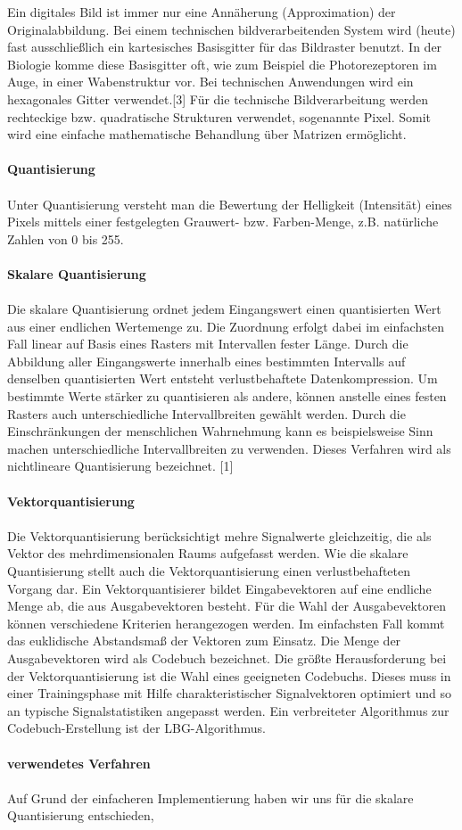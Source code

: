 Ein digitales Bild ist immer nur eine Annäherung (Approximation) der Originalabbildung.
Bei einem technischen bildverarbeitenden System wird  (heute) fast ausschließlich ein
kartesisches Basisgitter für das Bildraster benutzt. In der Biologie komme diese Basisgitter oft, wie zum Beispiel die Photorezeptoren im Auge, in einer Wabenstruktur vor. Bei technischen Anwendungen wird ein hexagonales Gitter verwendet.[3]
 Für die technische Bildverarbeitung werden rechteckige bzw. quadratische Strukturen verwendet, sogenannte Pixel. Somit wird eine einfache mathematische Behandlung über Matrizen ermöglicht.
 \\
 \\
\textbf{Quantisierung}
\\
\\
Unter Quantisierung versteht man die Bewertung der Helligkeit (Intensität) eines Pixels mittels einer
festgelegten Grauwert- bzw. Farben-Menge, z.B. natürliche Zahlen von 0 bis 255.
\\
 \\
 \textbf{Skalare Quantisierung} 
 \\
 \\
Die skalare Quantisierung ordnet jedem Eingangswert einen quantisierten Wert aus einer endlichen Wertemenge zu. Die Zuordnung erfolgt dabei im einfachsten Fall linear auf Basis eines Rasters mit 
Intervallen fester Länge. Durch die Abbildung aller Eingangswerte innerhalb eines bestimmten Intervalls auf denselben quantisierten Wert entsteht verlustbehaftete Datenkompression. Um bestimmte Werte stärker zu quantisieren als andere, können anstelle eines festen Rasters auch unterschiedliche Intervallbreiten gewählt werden. Durch die Einschränkungen der menschlichen Wahrnehmung kann es beispielsweise Sinn machen unterschiedliche Intervallbreiten zu verwenden. Dieses Verfahren wird als nichtlineare Quantisierung bezeichnet. [1]
\\
\\
\textbf{Vektorquantisierung}
\\
\\
Die Vektorquantisierung berücksichtigt mehre Signalwerte gleichzeitig, die als Vektor des mehrdimensionalen Raums aufgefasst werden. Wie die skalare Quantisierung stellt auch die Vektorquantisierung einen verlustbehafteten Vorgang dar. Ein Vektorquantisierer bildet Eingabevektoren auf eine endliche Menge ab, die aus Ausgabevektoren besteht. Für die Wahl der Ausgabevektoren können verschiedene Kriterien herangezogen werden. Im einfachsten Fall kommt das euklidische Abstandsmaß der Vektoren zum Einsatz. Die Menge der Ausgabevektoren wird als Codebuch bezeichnet. Die größte Herausforderung bei der Vektorquantisierung ist die Wahl eines geeigneten Codebuchs. Dieses muss in einer Trainingsphase mit Hilfe charakteristischer Signalvektoren optimiert und so an typische Signalstatistiken angepasst werden. Ein verbreiteter Algorithmus zur Codebuch-Erstellung ist der LBG-Algorithmus. 
\\
\\
\textbf{verwendetes Verfahren}
\\
\\
Auf Grund der einfacheren Implementierung haben wir uns für die skalare Quantisierung entschieden,

